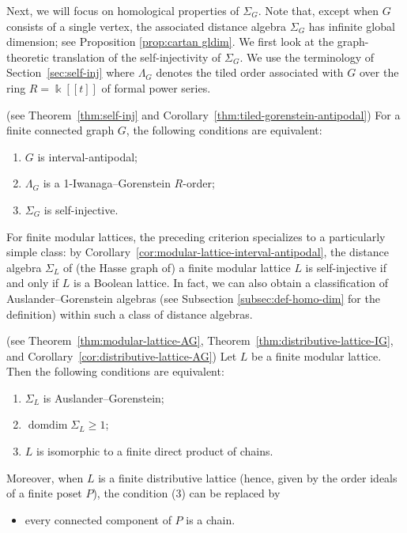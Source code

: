 \documentclass[a4paper,leqno]{amsart}
\begin{document}
Next, we will focus on homological properties of $\Sigma_G$.
Note that, except when $G$ consists of a single vertex, the associated distance algebra $\Sigma_G$ has infinite global dimension; see Proposition \ref{prop:cartan gldim}.
We first look at the graph-theoretic translation of the self-injectivity of $\Sigma_G$.  
We use the terminology of Section~\ref{sec:self-inj} where $\Lambda_G$ denotes the tiled order associated with $G$ over the ring $R=\Bbbk[[t]]$ of formal power series.

\begin{thm}\textnormal{(see Theorem~\ref{thm:self-inj} and
Corollary~\ref{thm:tiled-gorenstein-antipodal})}
For a finite connected graph $G$, the following conditions are
equivalent:
\begin{enumerate}
    \item $G$ is interval-antipodal;
    \item $\Lambda_G$ is a 1-Iwanaga--Gorenstein $R$-order;
    \item $\Sigma_G$ is self-injective.
\end{enumerate}
\end{thm}

For finite modular lattices, the preceding criterion specializes to a particularly simple class: by Corollary~\ref{cor:modular-lattice-interval-antipodal}, the distance algebra $\Sigma_L$ of (the Hasse graph of) a finite modular lattice $L$ is self-injective if and only if $L$ is a Boolean lattice.  
In fact, we can also obtain a classification of Auslander--Gorenstein algebras (see Subsection \ref{subsec:def-homo-dim} for the definition) within such a class of distance algebras.

\begin{thm}\textnormal{(see Theorem~\ref{thm:modular-lattice-AG},
Theorem~\ref{thm:distributive-lattice-IG}, and
Corollary~\ref{cor:distributive-lattice-AG})}
Let $L$ be a finite modular lattice.  Then the following conditions are
equivalent:
\begin{enumerate}
    \item $\Sigma_L$ is Auslander--Gorenstein;
    \item $\operatorname{domdim}\Sigma_L\geq1$;
    \item $L$ is isomorphic to a finite direct product of chains.
\end{enumerate}
Moreover, when $L$ is a finite distributive lattice (hence, given by the order ideals of a finite poset $P$), the condition (3) can be replaced by
\begin{itemize}
    \item[\rm(3')] every connected component of $P$ is a chain.
\end{itemize}
\end{thm}
\end{document}
